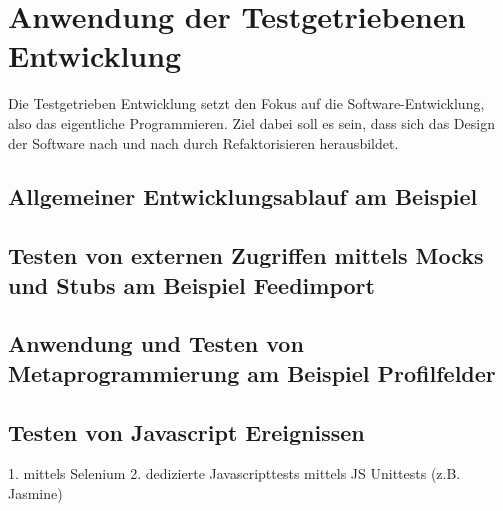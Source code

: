 \section{Anwendung der Testgetriebenen Entwicklung}
Die Testgetrieben Entwicklung setzt den Fokus auf die Software-Entwicklung, also das eigentliche Programmieren. Ziel dabei soll es sein, dass sich das Design der Software nach und nach durch Refaktorisieren herausbildet.
    \subsection{Allgemeiner Entwicklungsablauf am Beispiel}
    \subsection{Testen von externen Zugriffen mittels Mocks und Stubs am Beispiel Feedimport}
    
    \subsection{Anwendung und Testen von Metaprogrammierung am Beispiel Profilfelder}
    \subsection{Testen von Javascript Ereignissen}
      1. mittels Selenium
      2. dedizierte Javascripttests mittels JS Unittests (z.B. Jasmine)
